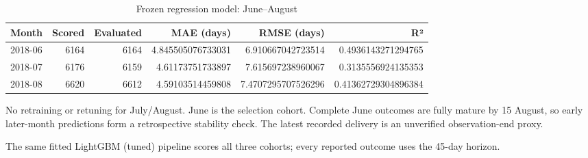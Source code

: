 \begin{table}[htbp]
\centering
\small
\caption{Frozen regression model: June–August}
\begin{tabular}{lrrrrr}
\toprule
Month & Scored & Evaluated & MAE (days) & RMSE (days) & R² \\
\midrule
2018-06 & 6164 & 6164 & 4.845505076733031 & 6.910667042723514 & 0.4936143271294765 \\
2018-07 & 6176 & 6159 & 4.61173751733897 & 7.615697238960067 & 0.3135556924135353 \\
2018-08 & 6620 & 6612 & 4.59103514459808 & 7.4707295707526296 & 0.41362729304896384 \\
\bottomrule
\end{tabular}
\par\smallskip\begin{minipage}{\linewidth}\footnotesize No retraining or retuning for July/August. June is the selection cohort. Complete June outcomes are fully mature by 15 August, so early later-month predictions form a retrospective stability check. The latest recorded delivery is an unverified observation-end proxy.\end{minipage}
\end{table}
The same fitted LightGBM (tuned) pipeline scores all three cohorts; every reported outcome uses the 45-day horizon.
